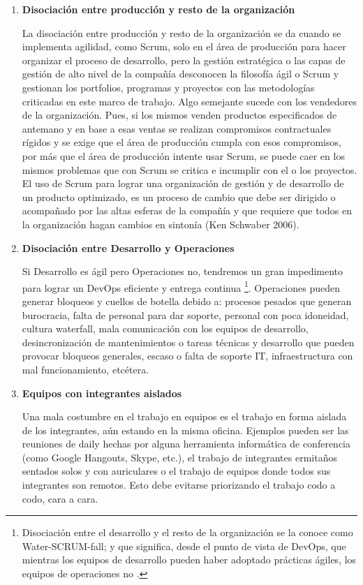 \begin{enumerate}
\item \textbf{Disociación entre producción y resto de la organización}

La disociación entre producción y resto de la organización se da cuando se implementa agilidad, como Scrum, solo en el área de producción para hacer organizar el proceso de desarrollo, pero la gestión estratégica o las capas de gestión de alto nivel de la compañía desconocen la filosofía ágil o Scrum y gestionan los portfolios, programas y proyectos con las metodologías criticadas en este marco de trabajo. Algo semejante sucede con los vendedores de la organización. Pues, si los mismos venden productos especificados de antemano y en base a esas ventas se realizan compromisos contractuales rígidos y se exige que el área de producción cumpla con esos compromisos, por más que el área de producción intente usar Scrum, se puede caer en los mismos problemas que con Scrum se critica e incumplir con el o los proyectos. El uso de Scrum para lograr una organización de gestión y de desarrollo de un producto optimizado, es un proceso de cambio que debe ser dirigido o acompañado por las altas esferas de la compañía y que requiere que todos en la organización hagan cambios en sintonía (Ken Schwaber 2006).

\item \textbf{Disociación entre Desarrollo y Operaciones}

Si Desarrollo es ágil pero Operaciones no, tendremos un gran impedimento para lograr un DevOps eficiente y entrega continua \footnote{Disociación entre el desarrollo y el resto de la organización se la conoce como Water-SCRUM-fall; y que significa, desde el punto de vista de DevOps, que mientras los equipos de desarrollo pueden haber adoptado prácticas ágiles, los equipos de operaciones no \cite{DevOps-for-dummies-2015}.}. Operaciones pueden generar bloqueos y cuellos de botella debido a: procesos pesados que generan burocracia, falta de personal para dar soporte, personal con poca idoneidad, cultura waterfall, mala comunicación con los equipos de desarrollo, desincronización de mantenimientos o tareas técnicas y desarrollo que pueden provocar bloqueos generales, escaso o falta de soporte IT, infraestructura con mal funcionamiento, etcétera.

\item \textbf{Equipos con integrantes aislados}

Una mala costumbre en el trabajo en equipos es el trabajo en forma aislada de los integrantes, aún estando en la misma oficina. Ejemplos pueden ser las reuniones de daily hechas por alguna herramienta informática de conferencia (como Google Hangouts, Skype, etc.), el trabajo de integrantes ermitaños sentados solos y con auriculares o el trabajo de equipos donde todos sus integrantes son remotos. Esto debe evitarse priorizando el trabajo codo a codo, cara a cara.


\end{enumerate}
